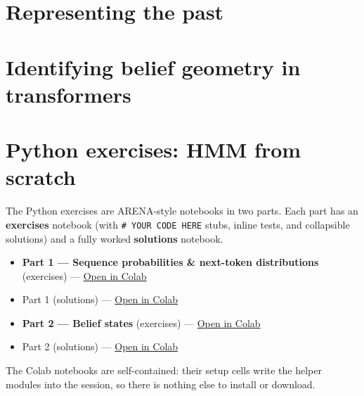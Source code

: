 \documentclass[11pt]{article}
\begin{document}
\section{Representing the past}\label{sec:representing-the-past}


\section{Identifying belief geometry in transformers}\label{sec:belief-geometry}


\section{Python exercises: HMM from scratch}\label{sec:python-exercises}

The Python exercises are ARENA-style notebooks in two parts. Each part has an
\textbf{exercises} notebook (with \texttt{\# YOUR CODE HERE} stubs, inline tests, and
collapsible solutions) and a fully worked \textbf{solutions} notebook.

\begin{itemize}
\item
  \textbf{Part 1 --- Sequence probabilities \& next-token distributions} (exercises) --- \href{https://colab.research.google.com/github/iliad-team/iliad-intensive-C.3/blob/main/python-exercises/colab/part1_sequence_probabilities_exercises_colab.ipynb}{Open in Colab}
\item
  Part 1 (solutions) --- \href{https://colab.research.google.com/github/iliad-team/iliad-intensive-C.3/blob/main/python-exercises/colab/part1_sequence_probabilities_solutions_colab.ipynb}{Open in Colab}
\item
  \textbf{Part 2 --- Belief states} (exercises) --- \href{https://colab.research.google.com/github/iliad-team/iliad-intensive-C.3/blob/main/python-exercises/colab/part2_belief_states_exercises_colab.ipynb}{Open in Colab}
\item
  Part 2 (solutions) --- \href{https://colab.research.google.com/github/iliad-team/iliad-intensive-C.3/blob/main/python-exercises/colab/part2_belief_states_solutions_colab.ipynb}{Open in Colab}
\end{itemize}

The Colab notebooks are self-contained: their setup cells write the helper
modules into the session, so there is nothing else to install or download.
\end{document}
